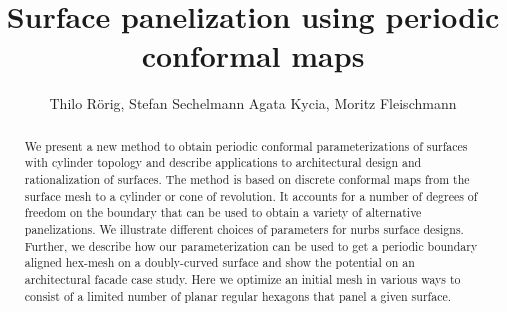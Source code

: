 \documentclass[twoside]{article}
\newcommand{\nurbs}{{\sc nurbs}\xspace}
\def\subfilebibliography {
	
}
\begin{document}
\def\subfilebibliography{}
\title{Surface panelization using periodic conformal maps}
\def\shortauthor{T.~R\"orig, S.~Sechelmann, A.~Kycia, M.~Fleischmann}
\def\shorttitle{Periodic conformal maps}
\author{Thilo R\"orig, Stefan Sechelmann
Agata Kycia, Moritz Fleischmann
}
\maketitle

\begin{abstract}
  We present a new method to obtain periodic conformal
  parameterizations of surfaces with cylinder topology and describe
  applications to architectural design and rationalization of
  surfaces. The method is based on discrete conformal maps from the
  surface mesh to a cylinder or cone of revolution. It accounts for a
  number of degrees of freedom on the boundary that can be used to
  obtain a variety of alternative panelizations. We illustrate
  different choices of parameters for \nurbs surface designs. Further,
  we describe how our parameterization can be used to get a periodic
  boundary aligned hex-mesh on a doubly-curved surface and show the
  potential on an architectural facade case study.  Here we optimize
  an initial mesh in various ways to consist of a limited number of
  planar regular hexagons that panel a given surface.
\end{abstract}
\end{document}

